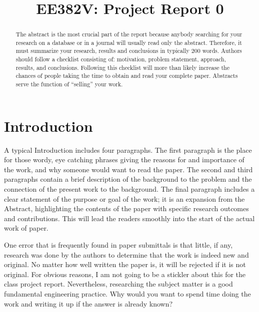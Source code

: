 \documentclass[conference]{IEEEtran}
\begin{document}
\title{EE382V: Project Report 0}

\author{
\and
{}
}

\maketitle

\begin{abstract}

The abstract is the most crucial part of the report because anybody searching for your research on a database or in a journal will usually read only the abstract. Therefore, it must summarize your research, results and conclusions in typically 200 words.  Authors should follow a checklist consisting of: motivation, problem statement, approach, results, and conclusions. Following this checklist will more than likely increase the chances of people taking the time to obtain and read your complete paper. Abstracts serve the function of ``selling'' your work.

\end{abstract}

\section{Introduction}

A typical Introduction includes four paragraphs. The first paragraph is the place for those wordy, eye catching phrases giving the reasons for and importance of the work, and why someone would want to read the paper. The second and third paragraphs contain a brief description of the background to the problem and the connection of the present work to the background. The final paragraph includes a clear statement of the purpose or goal of the work; it is an expansion from the Abstract, highlighting the contents of the paper with specific research outcomes and contributions. This will lead the readers smoothly into the start of the actual work of paper.

One error that is frequently found in paper submittals is that little, if any, research was done by the authors to determine that the work is indeed new and original. No matter how well written the paper is, it will be rejected if it is not original. For obvious reasons, I am not going to be a stickler about this for the class project report. ­Nevertheless, researching the subject matter is a good fundamental engineering practice. Why would you want to spend time doing the work and writing it up if the answer is already known?
\end{document}
